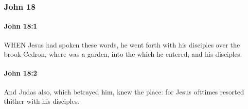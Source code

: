 	\subsubsection{John 18} %
		\label{JOHN-18}
		
		\paragraph{John 18:1} %
			\label{JOHN-18-1}

			WHEN Jesus had spoken these words, he went forth with his disciples over the brook Cedron, where was a garden, into the which he entered, and his disciples.

			\begin{framed}
				\scriptsize
				\begin{compactdesc}
					\item[SBLG] 
				\end{compactdesc}
			\end{framed}

		\paragraph{John 18:2} %
			\label{JOHN-18-2}

			And Judas also, which betrayed him, knew the place: for Jesus ofttimes resorted thither with his disciples.

